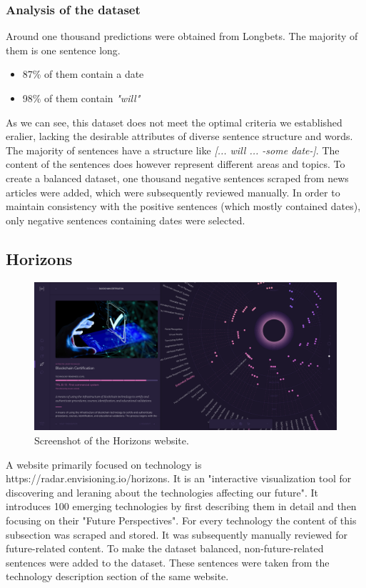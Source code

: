 \documentclass[a4paper,12pt]{report} %
\begin{document}
\subsubsection{Analysis of the dataset}
Around one thousand predictions were obtained from Longbets. The majority of them is one sentence long.
\begin{itemize}
  \item 87\% of them contain a date
  \item 98\% of them contain \textit{"will"}
\end{itemize}

As we can see, this dataset does not meet the optimal criteria we established eralier, lacking the desirable attributes of diverse sentence structure and words. The majority of sentences have a structure like \textit{[... will ... -some date-]}. The content of the sentences does however represent different areas and topics.     
To create a balanced dataset, one thousand negative sentences scraped from news articles were added, which were subsequently reviewed manually. In order to maintain consistency with the positive sentences (which mostly contained dates), only negative sentences containing dates were selected.



\subsection{Horizons}
\begin{figure}
  \centering
  \includegraphics[width=16cm]{img/horizons.png}
  \caption{Screenshot of the Horizons website.}
  \label{fig:horizons}
\end{figure}
A website primarily focused on technology is https://radar.envisioning.io/horizons. It is an "interactive visualization tool for discovering and leraning about the technologies affecting our future". It introduces 100 emerging technologies by first describing them in detail and then focusing on their "Future Perspectives". For every technology the content of this subsection was scraped and stored. It was subsequently manually reviewed for future-related content.     
To make the dataset balanced, non-future-related sentences were added to the dataset. These sentences were taken from the technology description section of the same website.
\end{document}
